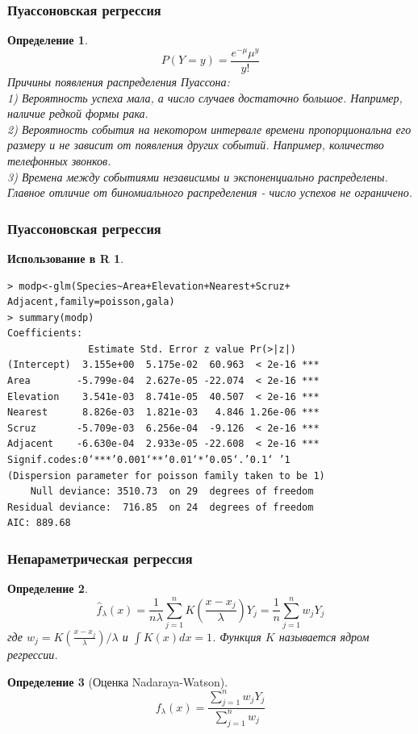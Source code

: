 \documentclass{beamer}
\newtheorem{defn}{Определение}
\newtheorem{exmpr}{Использование в R}
\begin{document}
\begin{frame}
\frametitle{Пуассоновская регрессия}
\begin{defn}
$$P(Y=y)=\frac{e^{-\mu}\mu^y}{y!}$$
Причины появления распределения Пуассона:\\
1) Вероятность успеха мала, а число случаев достаточно большое. Например, наличие редкой формы рака.\\
2) Вероятность события на некотором интервале времени пропорциональна его размеру и не зависит от появления других событий. Например, количество телефонных звонков.\\
3) Времена между событиями независимы и экспоненциально распределены.
Главное отличие от биномиального распределения - число успехов не ограничено.
\end{defn}
\end{frame}

\begin{frame}[containsverbatim]
\frametitle{Пуассоновская регрессия}
\begin{exmpr}
\begin{verbatim}
> modp<-glm(Species~Area+Elevation+Nearest+Scruz+
Adjacent,family=poisson,gala)
> summary(modp)  
Coefficients:
              Estimate Std. Error z value Pr(>|z|)    
(Intercept)  3.155e+00  5.175e-02  60.963  < 2e-16 ***
Area        -5.799e-04  2.627e-05 -22.074  < 2e-16 ***
Elevation    3.541e-03  8.741e-05  40.507  < 2e-16 ***
Nearest      8.826e-03  1.821e-03   4.846 1.26e-06 ***
Scruz       -5.709e-03  6.256e-04  -9.126  < 2e-16 ***
Adjacent    -6.630e-04  2.933e-05 -22.608  < 2e-16 ***
Signif.codes:0‘***’0.001‘**’0.01‘*’0.05‘.’0.1‘ ’1 
(Dispersion parameter for poisson family taken to be 1)
    Null deviance: 3510.73  on 29  degrees of freedom
Residual deviance:  716.85  on 24  degrees of freedom
AIC: 889.68
\end{verbatim}
\end{exmpr}
\end{frame}

\begin{frame}
\frametitle{Непараметрическая регрессия}
\begin{defn}
$$\hat{f}_{\lambda}(x)=\frac{1}{n\lambda}\sum_{j=1}^n{K\left(\frac{x-x_j}{\lambda}\right)Y_j}=\frac{1}{n}\sum_{j=1}^n{w_jY_j}$$
где $w_j=K\left(\frac{x-x_j}{\lambda}\right)/\lambda$ и $\int K(x)dx=1$. Функция $K$ называется ядром регрессии.
\end{defn}
\begin{defn}[Оценка Nadaraya-Watson]
$$f_{\lambda}(x)=\frac{\sum_{j=1}^n{w_jY_j}}{\sum_{j=1}^n{w_j}}$$
\end{defn}
\end{frame}
\end{document}
